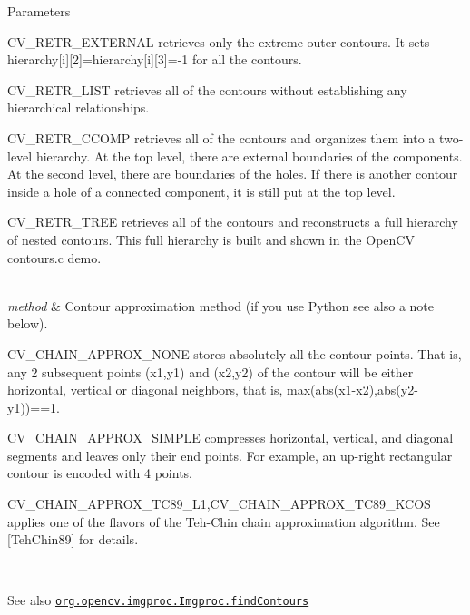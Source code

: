 \begin{DoxyParams}{Parameters}
\begin{DoxyItemize}
\item C\+V\+\_\+\+R\+E\+T\+R\+\_\+\+E\+X\+T\+E\+R\+N\+AL retrieves only the extreme outer contours. It sets {\ttfamily hierarchy\mbox{[}i\mbox{]}\mbox{[}2\mbox{]}=hierarchy\mbox{[}i\mbox{]}\mbox{[}3\mbox{]}=-\/1} for all the contours. 
\item C\+V\+\_\+\+R\+E\+T\+R\+\_\+\+L\+I\+ST retrieves all of the contours without establishing any hierarchical relationships. 
\item C\+V\+\_\+\+R\+E\+T\+R\+\_\+\+C\+C\+O\+MP retrieves all of the contours and organizes them into a two-\/level hierarchy. At the top level, there are external boundaries of the components. At the second level, there are boundaries of the holes. If there is another contour inside a hole of a connected component, it is still put at the top level. 
\item C\+V\+\_\+\+R\+E\+T\+R\+\_\+\+T\+R\+EE retrieves all of the contours and reconstructs a full hierarchy of nested contours. This full hierarchy is built and shown in the Open\+CV {\ttfamily contours.\+c} demo. 
\end{DoxyItemize}\\
\hline
{\em method} & Contour approximation method (if you use Python see also a note below). 
\begin{DoxyItemize}
\item C\+V\+\_\+\+C\+H\+A\+I\+N\+\_\+\+A\+P\+P\+R\+O\+X\+\_\+\+N\+O\+NE stores absolutely all the contour points. That is, any 2 subsequent points {\ttfamily (x1,y1)} and {\ttfamily (x2,y2)} of the contour will be either horizontal, vertical or diagonal neighbors, that is, {\ttfamily max(abs(x1-\/x2),abs(y2-\/y1))==1}. 
\item C\+V\+\_\+\+C\+H\+A\+I\+N\+\_\+\+A\+P\+P\+R\+O\+X\+\_\+\+S\+I\+M\+P\+LE compresses horizontal, vertical, and diagonal segments and leaves only their end points. For example, an up-\/right rectangular contour is encoded with 4 points. 
\item C\+V\+\_\+\+C\+H\+A\+I\+N\+\_\+\+A\+P\+P\+R\+O\+X\+\_\+\+T\+C89\+\_\+\+L1,C\+V\+\_\+\+C\+H\+A\+I\+N\+\_\+\+A\+P\+P\+R\+O\+X\+\_\+\+T\+C89\+\_\+\+K\+C\+OS applies one of the flavors of the Teh-\/\+Chin chain approximation algorithm. See \mbox{[}Teh\+Chin89\mbox{]} for details. 
\end{DoxyItemize}\\
\hline
\end{DoxyParams}
\begin{DoxySeeAlso}{See also}
\href{http://docs.opencv.org/modules/imgproc/doc/structural_analysis_and_shape_descriptors.html#findcontours}{\tt org.\+opencv.\+imgproc.\+Imgproc.\+find\+Contours} 
\end{DoxySeeAlso}
\mbox{\label{classorg_1_1opencv_1_1imgproc_1_1_imgproc_aa1223b61730baf7b52760332c5cdd8f5}} 
